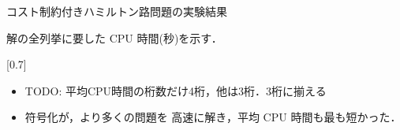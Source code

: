 \documentclass[dvipdfmx]{beamer}
\begin{document}
\begin{frame}{コスト制約付きハミルトン路問題の実験結果}

\begin{block}{}\centering
  解の全列挙に要した CPU 時間(秒)を示す．
\end{block}

\begin{center}
  \scalebox{0.7}[0.7]{
    
  }
\end{center}


\begin{itemize}
\item \alert{TODO: 平均CPU時間の桁数だけ4桁，他は3桁．3桁に揃える}
\item {} 符号化が，より多くの問題を
  高速に解き，平均 CPU 時間も最も短かった．
\end{itemize}  
\end{frame}
\end{document}
